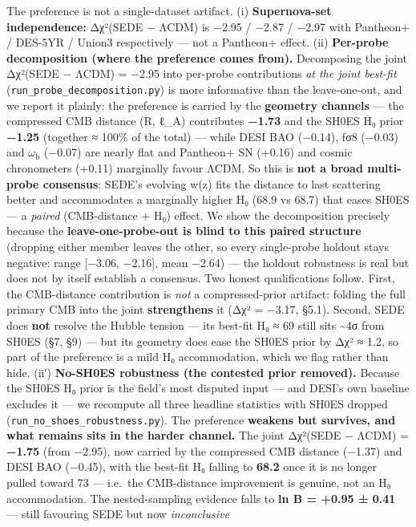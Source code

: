 \documentclass[
  10pt,
]{article}
\begin{document}
The preference is not a single-dataset artifact. (i)
\textbf{Supernova-set independence:} Δχ²(SEDE − ΛCDM) is −2.95 / −2.87 /
−2.97 with Pantheon+ / DES-5YR / Union3 respectively --- not a Pantheon+
effect. (ii) \textbf{Per-probe decomposition (where the preference comes
from).} Decomposing the joint Δχ²(SEDE − ΛCDM) = −2.95 into per-probe
contributions \emph{at the joint best-fit}
(\texttt{run\_probe\_decomposition.py}) is more informative than the
leave-one-out, and we report it plainly: the preference is carried by
the \textbf{geometry channels} --- the compressed CMB distance (R, ℓ\_A)
contributes \textbf{−1.73} and the SH0ES H₀ prior \textbf{−1.25}
(together ≈ 100\% of the total) --- while DESI BAO (−0.14), fσ8 (−0.03)
and \(\omega _{\mathrm{b}}\) (−0.07) are nearly flat and Pantheon+ SN
(+0.16) and cosmic chronometers (+0.11) marginally favour ΛCDM. So this
is \textbf{not a broad multi-probe consensus}: SEDE's evolving w(z) fits
the distance to last scattering better and accommodates a marginally
higher H₀ (68.9 vs 68.7) that eases SH0ES --- a \emph{paired}
(CMB-distance + H₀) effect. We show the decomposition precisely because
the \textbf{leave-one-probe-out is blind to this paired structure}
(dropping either member leaves the other, so every single-probe holdout
stays negative: range {[}−3.06, −2.16{]}, mean −2.64) --- the holdout
robustness is real but does not by itself establish a consensus. Two
honest qualifications follow. First, the CMB-distance contribution is
\emph{not} a compressed-prior artifact: folding the full primary CMB
into the joint \textbf{strengthens} it (Δχ² = −3.17, §5.1). Second, SEDE
does \textbf{not} resolve the Hubble tension --- its best-fit H₀ ≈ 69
still sits \textasciitilde4σ from SH0ES (§7, §9) --- but its geometry
does ease the SH0ES prior by Δχ² ≈ 1.2, so part of the preference is a
mild H₀ accommodation, which we flag rather than hide. (ii′)
\textbf{No-SH0ES robustness (the contested prior removed).} Because the
SH0ES H₀ prior is the field's most disputed input --- and DESI's own
baseline excludes it --- we recompute all three headline statistics with
SH0ES dropped (\texttt{run\_no\_shoes\_robustness.py}). The preference
\textbf{weakens but survives, and what remains sits in the harder
channel.} The joint Δχ²(SEDE − ΛCDM) = \textbf{−1.75} (from −2.95), now
carried by the compressed CMB distance (−1.37) and DESI BAO (−0.45),
with the best-fit H₀ falling to \textbf{68.2} once it is no longer
pulled toward 73 --- i.e.~the CMB-distance improvement is genuine, not
an H₀ accommodation. The nested-sampling evidence falls to \textbf{ln B
= +0.95 ± 0.41} --- still favouring SEDE but now \emph{inconclusive}
\end{document}
